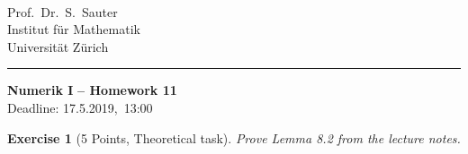\documentclass[11pt,a4paper,english,hyperref]{article}
\newcommand\blattNummer{11}
\newcommand\abgabeDatum{17.5.2019}
\newcounter{aufgabeNummer}
\theoremstyle{break}   %
\newtheorem{Aufgabe}[aufgabeNummer]{Exercise}
\begin{document}
\parbox{0ex}{    }   \\
\parbox{25ex}{
  Prof.~Dr.~S.~Sauter\\
  Institut für Mathematik\\
  Universität Zürich
  }
%
\rule[0cm]{0.cm}{.01cm}                  
\hfill  \parbox{0.6\textwidth}{
  {\sf\LARGE\bfseries Numerik I}
  {\sf\Large\bfseries \;\;--\;\; Homework \blattNummer }\\[1.5ex]
  Deadline: \abgabeDatum,\ 13:00
}
\vspace{5ex}
  
\begin{Aufgabe}[5 Points, Theoretical task]
  Prove Lemma 8.2 from the lecture notes.
\end{Aufgabe}
\end{document}
